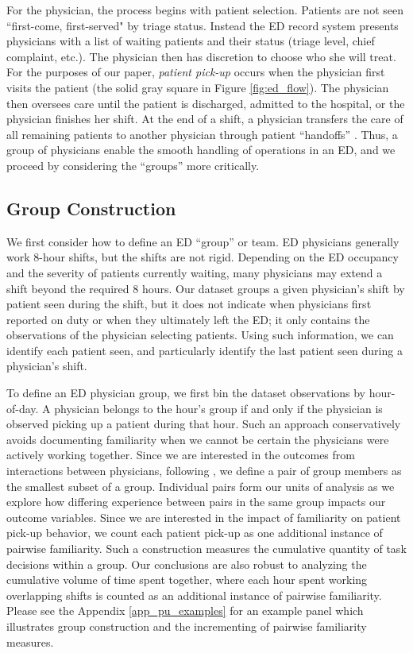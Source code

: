  For the physician, the process begins with patient selection. Patients are not seen “first-come, first-served" by triage status. Instead the ED record system presents physicians with a list of waiting patients and their status (triage level, chief complaint, etc.). The physician then has discretion to choose who she will treat. For the purposes of our paper, \textit{patient pick-up} occurs when the physician first visits the patient (the solid gray square in Figure \ref{fig:ed_flow}). The physician then oversees care until the patient is discharged, admitted to the hospital, or the physician finishes her shift. At the end of a shift, a physician transfers the care of all remaining patients to another physician through patient “handoffs” \citep[for discussion, see][]{Batt2019}. Thus, a group of physicians enable the smooth handling of operations in an ED, and we proceed by considering the “groups” more critically.

 \subsection{Group Construction} \label{grp_con}
 We first consider how to define an ED “group” or team. ED physicians generally work 8-hour shifts, but the shifts are not rigid. Depending on the ED occupancy and the severity of patients currently waiting, many physicians may extend a shift beyond the required 8 hours. Our dataset groups a given physician’s shift by patient seen during the shift, but it does not indicate when physicians first reported on duty or when they ultimately left the ED; it only contains the observations of the physician selecting patients. Using such information, we can identify each patient seen, and particularly identify the last patient seen during a physician’s shift.
 
 To define an ED physician group, we first bin the dataset observations by hour-of-day. A physician belongs to the hour’s group if and only if the physician is observed picking up a patient during that hour. Such an approach conservatively avoids documenting familiarity when we cannot be certain the physicians were actively working together. Since we are interested in the outcomes from interactions between physicians, following \cite{Avgerinos2017}, we define a pair of group members as the smallest subset of a group. Individual pairs form our units of analysis as we explore how differing experience between pairs in the same group impacts our outcome variables. Since we are interested in the impact of familiarity on patient pick-up behavior, we count each patient pick-up as one additional instance of pairwise familiarity. Such a construction measures the cumulative quantity of task decisions within a group. Our conclusions are also robust to analyzing the cumulative volume of time spent together, where each hour spent working overlapping shifts is counted as an additional instance of pairwise familiarity. Please see the Appendix \ref{app_pu_examples} for an example panel which illustrates group construction and the incrementing of pairwise familiarity measures.

